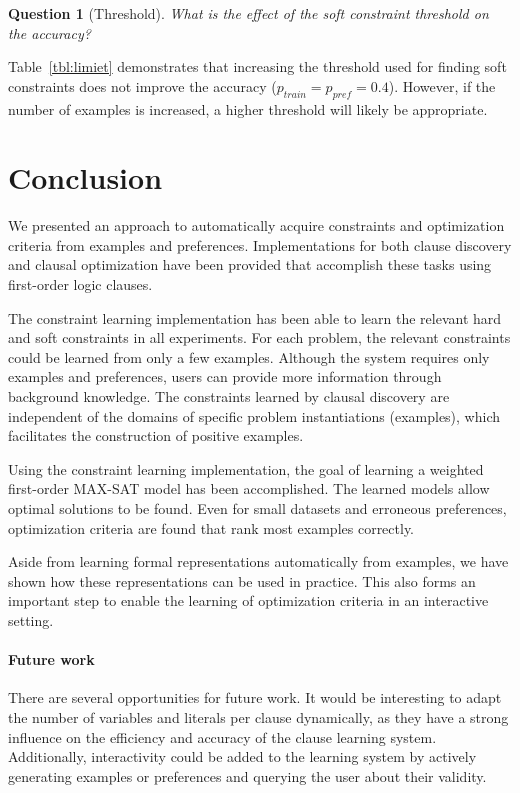 \documentclass[letterpaper]{article}
\newtheorem{question}{Question}
\theoremstyle{definition}
\begin{document}
\begin{question}[Threshold]
  What is the effect of the soft constraint threshold on the accuracy?
\end{question}

Table~\ref{tbl:limiet} demonstrates that increasing the threshold used for finding soft constraints does not improve the accuracy ($p_{train} = p_{pref} = 0.4$).
However, if the number of examples is increased, a higher threshold will likely be appropriate.


\section{Conclusion}
We presented an approach to automatically acquire constraints and optimization criteria from examples and preferences.
Implementations for both clause discovery and clausal optimization have been provided that accomplish these tasks using first-order logic clauses.

The constraint learning implementation has been able to learn the relevant hard and soft constraints in all experiments.
For each problem, the relevant constraints could be learned from only a few examples.
Although the system requires only examples and preferences, users can provide more information through background knowledge.
The constraints learned by clausal discovery are independent of the domains of specific problem instantiations (examples), which facilitates the construction of positive examples.

Using the constraint learning implementation, the goal of learning a weighted first-order MAX-SAT model has been accomplished.
The learned models allow optimal solutions to be found.
Even for small datasets and erroneous preferences, optimization criteria are found that rank most examples correctly.

Aside from learning formal representations automatically from examples, we have shown how these representations can be used in practice.
This also forms an important step to enable the learning of optimization criteria in an interactive setting.

\paragraph{Future work}
There are several opportunities for future work.
It would be interesting to adapt the number of variables and literals per clause dynamically, as they have a strong influence on the efficiency and accuracy of the clause learning system.
Additionally, interactivity could be added to the learning system by actively generating examples or preferences and querying the user about their validity.
\end{document}
